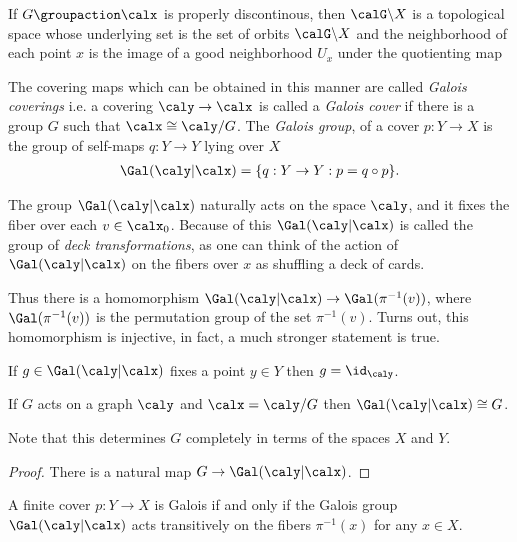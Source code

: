   If $G \groupaction \calx$ is properly discontinous, then $\calG \backslash X$ is a topological space whose underlying set is the set of orbits $\calG \backslash X$ and the neighborhood of each point $x$ is the image of a good neighborhood $U_x$ under the quotienting map



  The covering maps which can be obtained in this manner are called \emph{Galois coverings} i.e. a covering $\caly \rightarrow \calx$ is called a \emph{Galois cover} if there is a group $G$ such that $\calx \cong \caly / G$.
  The \emph{Galois group}, of a cover $p:Y \rightarrow X$ is the group of self-maps $q: Y \rightarrow Y$ lying over $X$
  \begin{align*}
    \Gal(\caly|\calx) = \{ q: Y \rightarrow Y : p = q \circ p \}.
  \end{align*}

  The group $\Gal(\caly|\calx)$ naturally acts on the space $\caly$, and it fixes the fiber over each $v \in \calx_0 $.
  Because of this $\Gal(\caly|\calx)$ is called the group of \emph{deck transformations}, as one can think of the action of $\Gal(\caly|\calx)$ on the fibers over $x$ as shuffling a deck of cards.

	Thus there is a homomorphism $\Gal(\caly|\calx) \rightarrow \Gal(\pi^{-1}(v))$, where $\Gal(\pi^{-1}(v))$ is the permutation group of the set $\pi^{-1}(v)$. Turns out, this homomorphism is injective, in fact, a much stronger statement is true.

	\begin{theorem}
		If $g \in \Gal(\caly|\calx)$ fixes a point $y \in Y$ then $g = \id_{\caly}$.
	\end{theorem}

	\begin{theorem}
		If $G$ acts on a graph $\caly$ and $\calx = \caly / G $ then $\Gal(\caly|\calx) \cong G$.
	\end{theorem}
	Note that this determines $G$ completely in terms of the spaces $X$ and $Y$.
	\begin{proof}
		There is a natural map $G \rightarrow \Gal(\caly|\calx)$.
	\end{proof}

  \begin{theorem}
    A finite cover $p:Y \rightarrow X$ is Galois if and only if the Galois group $\Gal(\caly|\calx)$ acts transitively on the fibers $\pi^{-1}(x)$ for any $x \in X$.
  \end{theorem}

